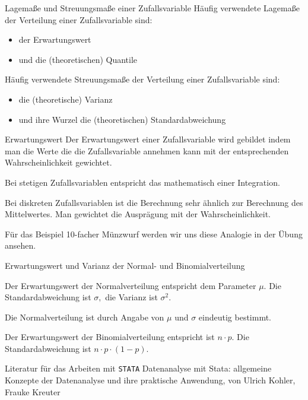 \documentclass[usenames,dvipsnames,handout]{beamer}
\begin{document}
\begin{frame}{Lagemaße und Streuungsmaße einer Zufallsvariable}
Häufig verwendete  Lagemaße der Verteilung einer Zufallsvariable sind:
\begin{itemize}
\item{der Erwartungswert}
\item{und die (theoretischen) Quantile}
\end{itemize}
Häufig verwendete Streuungsmaße der Verteilung einer Zufallsvariable sind:
\begin{itemize}
\item{die (theoretische) Varianz}
\item{und ihre Wurzel die (theoretischen) Standardabweichung}
\end{itemize}
\end{frame}

\begin{frame}{Erwartungswert}
Der Erwartungswert einer Zufallsvariable wird gebildet indem man die Werte die die Zufallsvariable annehmen kann mit der entsprechenden
Wahrscheinlichkeit gewichtet.
\begin{description}
\item{Bei stetigen Zufallsvariablen entspricht das mathematisch einer Integration.}\pause
\item{Bei diskreten Zufallsvariablen ist die Berechnung sehr ähnlich zur Berechnung des Mittelwertes. Man gewichtet die Ausprägung mit der Wahrscheinlichkeit.}\pause
\item{Für das Beispiel 10-facher Münzwurf werden wir uns diese Analogie in der Übung ansehen.}
\end{description}
\end{frame}

\begin{frame}{Erwartungswert und Varianz der Normal- und Binomialverteilung}
\begin{description}
\item{Der Erwartungswert der Normalverteilung entspricht dem Parameter $\mu.$ Die Standardabweichung ist $\sigma,$
die Varianz ist $\sigma^{2}.$}
\item{Die Normalverteilung ist durch Angabe von $\mu$ und $\sigma$ eindeutig bestimmt.}
\item{Der Erwartungswert der Binomialverteilung entspricht ist $n \cdot p.$ Die Standardabweichung ist $n \cdot p \cdot (1-p).$
}
\end{description}
\end{frame}

\begin{frame}{Literatur für das Arbeiten mit \texttt{STATA}}
Datenanalyse mit Stata: allgemeine Konzepte der Datenanalyse und ihre praktische Anwendung,
von Ulrich Kohler, Frauke Kreuter
\end{frame}
\end{document}
